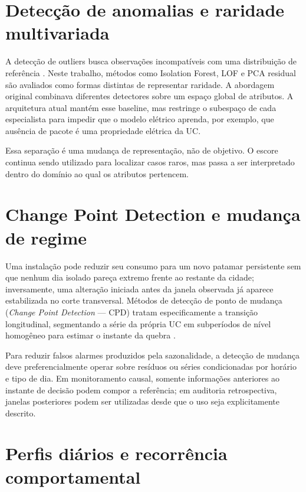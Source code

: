 \section{Detecção de anomalias e raridade multivariada}\label{detecuxe7uxe3o-de-anomalias-e-raridade-multivariada}

A detecção de outliers busca observações incompatíveis com uma distribuição de referência \autocite{aggarwal2017}. Neste trabalho, métodos como Isolation Forest, LOF e PCA residual são avaliados como formas distintas de representar raridade. A abordagem original combinava diferentes detectores sobre um espaço global de atributos. A arquitetura atual mantém esse baseline, mas restringe o subespaço de cada especialista para impedir que o modelo elétrico aprenda, por exemplo, que ausência de pacote é uma propriedade elétrica da UC.

Essa separação é uma mudança de representação, não de objetivo. O escore continua sendo utilizado para localizar casos raros, mas passa a ser interpretado dentro do domínio ao qual os atributos pertencem.

\section{Change Point Detection e mudança de regime}\label{change-point-detection-e-mudanuxe7a-de-regime}

Uma instalação pode reduzir seu consumo para um novo patamar persistente sem que nenhum dia isolado pareça extremo frente ao restante da cidade; inversamente, uma alteração iniciada antes da janela observada já aparece estabilizada no corte transversal. Métodos de detecção de ponto de mudança (\emph{Change Point Detection} --- CPD) tratam especificamente a transição longitudinal, segmentando a série da própria UC em subperíodos de nível homogêneo para estimar o instante da quebra \autocite{truong2020}.

Para reduzir falsos alarmes produzidos pela sazonalidade, a detecção de mudança deve preferencialmente operar sobre resíduos ou séries condicionadas por horário e tipo de dia. Em monitoramento causal, somente informações anteriores ao instante de decisão podem compor a referência; em auditoria retrospectiva, janelas posteriores podem ser utilizadas desde que o uso seja explicitamente descrito.

\section{Perfis diários e recorrência comportamental}\label{perfis-diuxe1rios-e-recorruxeancia-comportamental}

